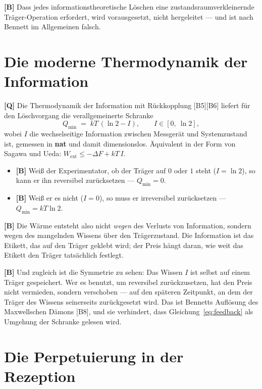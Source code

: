 \textbf{[B]} Dass jedes informationstheoretische Löschen eine zustandsraumverkleinernde
Träger-Operation erfordert, wird vorausgesetzt, nicht hergeleitet --- und ist nach
Bennett im Allgemeinen falsch.

\section{Die moderne Thermodynamik der Information}

\textbf{[Q]} Die Thermodynamik der Information mit Rückkopplung [B5][B6] liefert für den
Löschvorgang die verallgemeinerte Schranke
\begin{equation}
  Q_{\min} \;=\; k T\,(\ln 2 - I), \qquad I \in [0,\ \ln 2],
  \label{eq:feedback}
\end{equation}
wobei $I$ die wechselseitige Information zwischen Messgerät und Systemzustand ist,
gemessen in \textbf{nat} und damit dimensionslos. Äquivalent in der Form von
Sagawa und Ueda: $W_{\text{ext}} \le -\Delta F + kT\,I$.

\begin{itemize}[leftmargin=1.4em,itemsep=0.25em]
  \item \textbf{[B]} Weiß der Experimentator, ob der Träger auf $0$ oder $1$ steht
        ($I = \ln 2$), so kann er ihn reversibel zurücksetzen ---
        $Q_{\min} = 0$.
  \item \textbf{[B]} Weiß er es nicht ($I = 0$), so muss er irreversibel zurücksetzen ---
        $Q_{\min} = kT\ln 2$.
\end{itemize}

\textbf{[B]} Die Wärme entsteht also nicht \emph{wegen} des Verlusts von Information,
sondern wegen des mangelnden Wissens über den Trägerzustand. Die Information ist
das Etikett, das auf den Träger geklebt wird; der Preis hängt daran, wie weit das
Etikett den Träger tatsächlich festlegt.

\textbf{[B]} Und zugleich ist die Symmetrie zu sehen: Das Wissen $I$ ist selbst auf einem
Träger gespeichert. Wer es benutzt, um reversibel zurückzusetzen, hat den Preis
nicht vermieden, sondern verschoben --- auf den späteren Zeitpunkt, an dem der
Träger des Wissens seinerseits zurückgesetzt wird. Das ist Bennetts Auflösung des
Maxwellschen Dämons [B8], und sie verhindert, dass
Gleichung~\eqref{eq:feedback} als Umgehung der Schranke gelesen wird.

\section{Die Perpetuierung in der Rezeption}

